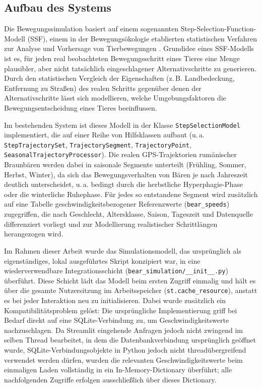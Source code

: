\documentclass[12pt,a4paper]{report}
\begin{document}
\subsection{Aufbau des Systems}

Die Bewegungssimulation basiert auf einem sogenannten Step-Selection-Function-Modell (SSF), einem in der Bewegungsökologie etablierten statistischen Verfahren zur Analyse und Vorhersage von Tierbewegungen \cite{TODO:SSFLiteratur}. Grundidee eines SSF-Modells ist es, für jeden real beobachteten Bewegungsschritt eines Tieres eine Menge plausibler, aber nicht tatsächlich eingeschlagener Alternativschritte zu generieren. Durch den statistischen Vergleich der Eigenschaften (z.\,B. Landbedeckung, Entfernung zu Straßen) des realen Schritts gegenüber denen der Alternativschritte lässt sich modellieren, welche Umgebungsfaktoren die Bewegungsentscheidung eines Tieres beeinflussen.

Im bestehenden System ist dieses Modell in der Klasse \texttt{StepSelectionModel} implementiert, die auf einer Reihe von Hilfsklassen aufbaut (u.\,a. \texttt{StepTrajectorySet}, \texttt{TrajectorySegment}, \texttt{TrajectoryPoint}, \texttt{SeasonalTrajectoryProcessor}). Die realen GPS-Trajektorien rumänischer Braunbären werden dabei in saisonale Segmente unterteilt (Frühling, Sommer, Herbst, Winter), da sich das Bewegungsverhalten von Bären je nach Jahreszeit deutlich unterscheidet, u.\,a. bedingt durch die herbstliche Hyperphagie-Phase oder die winterliche Ruhephase. Für jedes so entstandene Segment wird zusätzlich auf eine Tabelle geschwindigkeitsbezogener Referenzwerte (\texttt{bear\_speeds}) zugegriffen, die nach Geschlecht, Altersklasse, Saison, Tageszeit und Datenquelle differenziert vorliegt und zur Modellierung realistischer Schrittlängen herangezogen wird.

Im Rahmen dieser Arbeit wurde das Simulationsmodell, das ursprünglich als eigenständiges, lokal ausgeführtes Skript konzipiert war, in eine wiederverwendbare Integrationsschicht (\texttt{bear\_simulation/\_\_init\_\_.py}) überführt. Diese Schicht lädt das Modell beim ersten Zugriff einmalig und hält es über die gesamte Nutzersitzung im Arbeitsspeicher (\texttt{st.cache\_resource}), anstatt es bei jeder Interaktion neu zu initialisieren. Dabei wurde zusätzlich ein Kompatibilitätsproblem gelöst: Die ursprüngliche Implementierung griff bei Bedarf direkt auf eine SQLite-Verbindung zu, um Geschwindigkeitswerte nachzuschlagen. Da Streamlit eingehende Anfragen jedoch nicht zwingend im selben Thread bearbeitet, in dem die Datenbankverbindung ursprünglich geöffnet wurde, SQLite-Verbindungsobjekte in Python jedoch nicht threadübergreifend verwendet werden dürfen, wurden die relevanten Geschwindigkeitswerte beim einmaligen Laden vollständig in ein In-Memory-Dictionary überführt; alle nachfolgenden Zugriffe erfolgen ausschließlich über dieses Dictionary.
\end{document}
